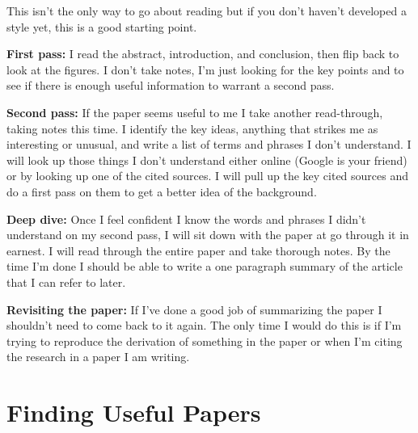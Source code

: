 \documentclass[12pt, letterpaper]{article}
\begin{document}
This isn't the only way to go about reading but if you don't haven't developed a style yet, this is a good starting point.

\textbf{First pass:}  I read the abstract, introduction, and conclusion, then flip back to look at the figures.  I don't take notes, I'm just looking for the key points and to see if there is enough useful information to warrant a second pass.

\textbf{Second pass:} If the paper seems useful to me I take another read-through, taking notes this time.  I identify the key ideas, anything that strikes me as interesting or unusual, and write a list of terms and phrases I don't understand.  I will look up those things I don't understand either online (Google is your friend) or by looking up one of the cited sources.  I will pull up the key cited sources and do a first pass on them to get a better idea of the background.

\textbf{Deep dive:}  Once I feel confident I know the words and phrases I didn't understand on my second pass, I will sit down with the paper at go through it in earnest.  I will read through the entire paper and take thorough notes.  By the time I'm done I should be able to write a one paragraph summary of the article that I can refer to later.

\textbf{Revisiting the paper:}  If I've done a good job of summarizing the paper I shouldn't need to come back to it again.  The only time I would do this is if I'm trying to reproduce the derivation of something in the paper or when I'm citing the research in a paper I am writing.


\section*{Finding Useful Papers}
\end{document}
